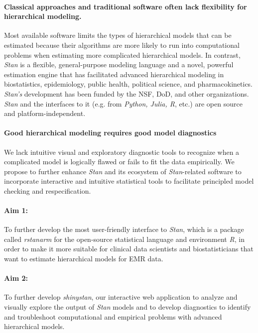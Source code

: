 \documentclass[11pt,notitlepage]{article}
\begin{document}
\paragraph*{Classical approaches and traditional software often lack flexibility 
for hierarchical modeling.} Most available software limits the types of 
hierarchical models that can be estimated because their algorithms are more likely 
to run into computational problems when estimating more complicated hierarchical models.
In contrast, \textit{Stan} is a flexible, general-purpose modeling language and a 
novel, powerful estimation engine that has facilitated 
advanced hierarchical modeling in biostatistics, epidemiology, public health, 
political science, and pharmacokinetics. \textit{Stan's} development has been funded 
by the NSF, DoD, and other organizations. \textit{Stan} and the interfaces to it
(e.g. from \textit{Python, Julia, R}, etc.) are open source and platform-independent.

\paragraph*{Good hierarchical modeling requires good model diagnostics} 
We lack intuitive visual and exploratory diagnostic tools to recognize when a complicated model is logically 
flawed or fails to fit the data empirically. We propose to further enhance \textit{Stan} and its ecosystem of 
\textit{Stan}-related software to incorporate interactive and intuitive statistical tools to facilitate principled model 
checking and respecification.

\paragraph*{Aim 1:} To further develop the most user-friendly interface to \textit{Stan}, 
which is a package called \textit{rstanarm} for the open-source statistical language and 
environment \textit{R}, in order to make it more suitable for clinical data 
scientists and biostatisticians that want to estimate hierarchical models for EMR data.

\paragraph*{Aim 2:} To further develop \textit{shinystan}, our interactive web application to 
analyze and visually explore the output of \textit{Stan} models and to develop diagnostics 
to identify and troubleshoot computational and empirical problems with advanced hierarchical models.
\end{document}
